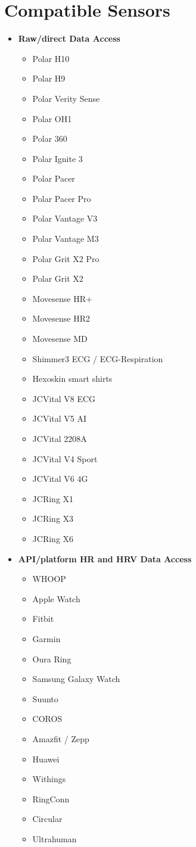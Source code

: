 \documentclass[
	fontsize=15pt,
	twoside=false,
	secnumdepth=2
]{kaobook}
\begin{document}
\appendix
{}

\chapter{Compatible Sensors}
\begin{itemize}
  \item \textbf{Raw/direct Data Access}
  \begin{itemize}
    \item Polar H10
    \item Polar H9
    \item Polar Verity Sense
    \item Polar OH1
    \item Polar 360
    \item Polar Ignite 3
    \item Polar Pacer
    \item Polar Pacer Pro
    \item Polar Vantage V3
    \item Polar Vantage M3
    \item Polar Grit X2 Pro
    \item Polar Grit X2
    \item Movesense HR+
    \item Movesense HR2
    \item Movesense MD
    \item Shimmer3 ECG / ECG-Respiration
    \item Hexoskin smart shirts
    \item JCVital V8 ECG
    \item JCVital V5 AI
    \item JCVital 2208A
    \item JCVital V4 Sport
    \item JCVital V6 4G
    \item JCRing X1
    \item JCRing X3
    \item JCRing X6
  \end{itemize}

  \item \textbf{API/platform HR and HRV Data Access}
  \begin{itemize}
    \item WHOOP
    \item Apple Watch
    \item Fitbit
    \item Garmin
    \item Oura Ring
    \item Samsung Galaxy Watch
    \item Suunto
    \item COROS
    \item Amazfit / Zepp
    \item Huawei
    \item Withings
    \item RingConn
    \item Circular
    \item Ultrahuman
  \end{itemize}
\end{itemize}

\backmatter
{}

\printbibliography[heading=bibintoc, title=Bibliography, prenote=bibnote]

\printindex
\end{document}
